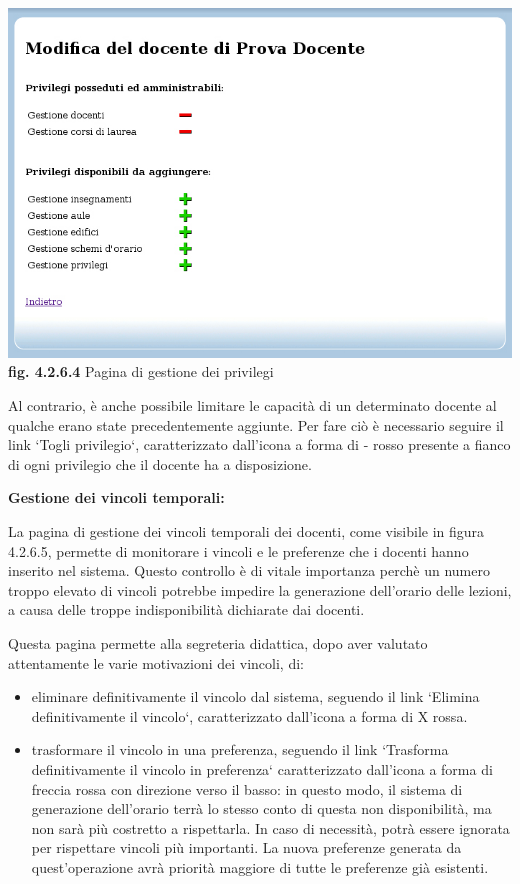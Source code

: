 \documentclass[11pt,a4paper]{article}
\begin{document}
\bigskip
\begin{center}
	\includegraphics[scale=0.5]{images/gestione_privilegi.jpg}\\
	\textbf{fig. 4.2.6.4} Pagina di gestione dei privilegi\\
\end{center}
\bigskip

Al contrario, è anche possibile limitare le capacità di un determinato docente al qualche erano state precedentemente aggiunte. Per fare ciò è necessario seguire il link `Togli privilegio`, caratterizzato dall'icona  a forma di - rosso presente a fianco di ogni privilegio che il docente ha a disposizione.
\newline \newline
\begin{large}\textbf{Gestione dei vincoli temporali:}\end{large}
\newline \newline
La pagina di gestione dei vincoli temporali dei docenti, come visibile in figura 4.2.6.5, permette di monitorare i vincoli e le preferenze che i docenti hanno inserito nel sistema. Questo controllo è di vitale importanza perchè un numero troppo elevato di vincoli potrebbe impedire la generazione dell'orario delle lezioni, a causa delle troppe indisponibilità dichiarate dai docenti.

Questa pagina permette alla segreteria didattica, dopo aver valutato attentamente le varie motivazioni dei vincoli, di:
\begin{itemize}
 \item eliminare definitivamente il vincolo dal sistema, seguendo il link `Elimina definitivamente il vincolo`, caratterizzato dall'icona a forma di X rossa.
 \item trasformare il vincolo in una preferenza, seguendo il link `Trasforma definitivamente il vincolo in preferenza` caratterizzato dall'icona a forma di freccia rossa con direzione verso il basso: in questo modo, il sistema di generazione dell'orario terrà lo stesso conto di questa non disponibilità, ma non sarà più costretto a rispettarla. In caso di necessità, potrà essere ignorata per rispettare vincoli più importanti. La nuova preferenze generata da quest'operazione avrà priorità maggiore di tutte le preferenze già esistenti.
\end{itemize}
\end{document}
